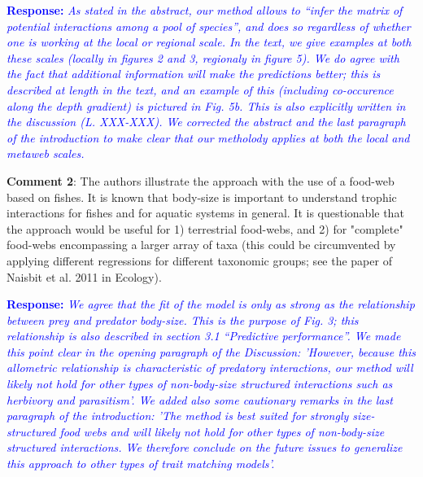 \documentclass [12pt,onecolumn,twoside,openright]{report}
\begin{document}
\begin{onehalfspacing}
\medskip \textcolor{blue}{\textbf{Response:}} \textit{\textcolor{blue}{As stated
in the abstract, our method allows to ``infer the matrix of potential
interactions among a pool of species'', and does so regardless of whether one is
working at the local or regional scale. In the text, we give examples at both
these scales (locally in figures 2 and 3, regionaly in figure 5). We do agree
with the fact that additional information will make the predictions better; this
is described at length in the text, and an example of this (including
co-occurence along the depth gradient) is pictured in Fig. 5b. This is also
explicitly written in the discussion (L. XXX-XXX). We corrected the abstract and the last paragraph of the introduction to make clear that our metholody applies at both the local and metaweb scales.}}

\medskip \textbf{Comment 2}: The authors illustrate the
approach with the use of a food-web based on fishes. It is known that body-size
is important to understand trophic interactions for fishes and for aquatic
systems in general. It is questionable that the approach would be useful for 1)
terrestrial food-webs, and 2) for "complete" food-webs encompassing a larger
array of taxa (this could be circumvented by applying different regressions for
different taxonomic groups; see the paper of Naisbit et al. 2011 in Ecology).

\medskip \textcolor{blue}{\textbf{Response:}} \textit{\textcolor{blue}{We agree
that the fit of the model is only as strong as the relationship between prey and
predator body-size. This is the purpose of Fig. 3; this relationship is also
described in section 3.1 ``Predictive performance''. We made this point clear in the opening paragraph of the Discussion: 'However, because this allometric relationship is characteristic of predatory interactions, our method will likely not hold for other types of non-body-size structured interactions such as herbivory and parasitism'. We added also some cautionary remarks in the last paragraph of the introduction: 'The method is best suited for strongly size-structured food webs and will likely not hold for other types of non-body-size structured interactions. We therefore conclude on the future issues to generalize this approach to other types of trait matching models'.}}


\end{onehalfspacing}
\end{document}
